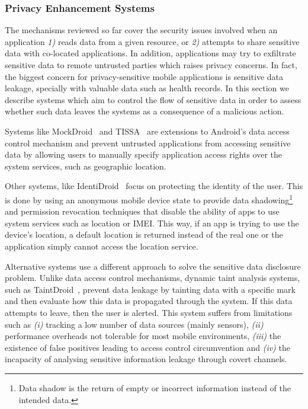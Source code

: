 
\subsubsection{Privacy Enhancement Systems}

The mechanisms reviewed so far cover the security issues involved when an application \emph{1)} reads data from a given resource, or \emph{2)} attempts to share sensitive data with co-located applications. In addition, applications may try to exfiltrate sensitive data to remote untrusted parties which raises privacy concerns. In fact, the biggest concern for privacy-sensitive mobile applications is sensitive data leakage, specially with valuable data such as health records. In this section we describe systems which aim to control the flow of sensitive data in order to assess whether such data leaves the systems as a consequence of a malicious action.

Systems like MockDroid~\cite{beresford2011mockdroid} and TISSA~\cite{zhou2011taming} are extensions to Android's data access control mechanism and prevent untrusted applications from accessing sensitive data by allowing users to manually specify application access rights over the system services, such as geographic location.

Other systems, like IdentiDroid~\cite{shebaro2014identidroid} focus on protecting the identity of the user. This is done by using an anonymous mobile device state to provide data shadowing\footnote{Data shadow is the return of empty or incorrect information instead of the intended data.} and permission revocation techniques that disable the ability of apps to use system services such as location or \ac{IMEI}. This way, if an app is trying to use the device's location, a default location is returned instead of the real one or the application simply cannot access the location service.

Alternative systems use a different approach to solve the sensitive data disclosure problem. Unlike data access control mechanisms, dynamic taint analysis systems, such as TaintDroid~\cite{enck2014taintdroid}, prevent data leakage by tainting data with a specific mark and then evaluate how this data is propagated through the system. If this data attempts to leave, then the user is alerted. This system suffers from limitations such as \emph{(i)} tracking a low number of data sources (mainly sensors), \emph{(ii)} performance overheads not tolerable for most mobile environments, \emph{(iii)} the existence of false positives leading to access control circumvention and \emph{(iv)} the incapacity of analysing sensitive information leakage through covert channels.

